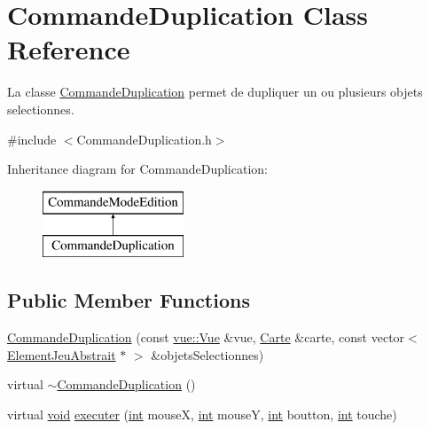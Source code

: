 \hypertarget{class_commande_duplication}{\section{Commande\-Duplication Class Reference}
\label{class_commande_duplication}
}


La classe \hyperlink{class_commande_duplication}{Commande\-Duplication} permet de dupliquer un ou plusieurs objets selectionnes.  




{\ttfamily \#include $<$Commande\-Duplication.\-h$>$}

Inheritance diagram for Commande\-Duplication\-:\begin{figure}[H]
\begin{center}
\leavevmode
\includegraphics[height=2.000000cm]{class_commande_duplication}
\end{center}
\end{figure}
\subsection*{Public Member Functions}
\begin{DoxyCompactItemize}
\item 
\hyperlink{class_commande_duplication_a789f1ac4650fb772699150a8de40ce91}{Commande\-Duplication} (const \hyperlink{classvue_1_1_vue}{vue\-::\-Vue} \&vue, \hyperlink{class_carte}{Carte} \&carte, const vector$<$ \hyperlink{class_element_jeu_abstrait}{Element\-Jeu\-Abstrait} $\ast$ $>$ \&objets\-Selectionnes)
\item 
virtual \hyperlink{class_commande_duplication_a9690bc3984ecfe34cb8a5d8f15c1fcf4}{$\sim$\-Commande\-Duplication} ()
\item 
virtual \hyperlink{wglew_8h_aeea6e3dfae3acf232096f57d2d57f084}{void} \hyperlink{class_commande_duplication_ab8f7e0df61599b747d80c06548b630a9}{executer} (\hyperlink{wglew_8h_a500a82aecba06f4550f6849b8099ca21}{int} mouse\-X, \hyperlink{wglew_8h_a500a82aecba06f4550f6849b8099ca21}{int} mouse\-Y, \hyperlink{wglew_8h_a500a82aecba06f4550f6849b8099ca21}{int} boutton, \hyperlink{wglew_8h_a500a82aecba06f4550f6849b8099ca21}{int} touche)
\end{DoxyCompactItemize}
